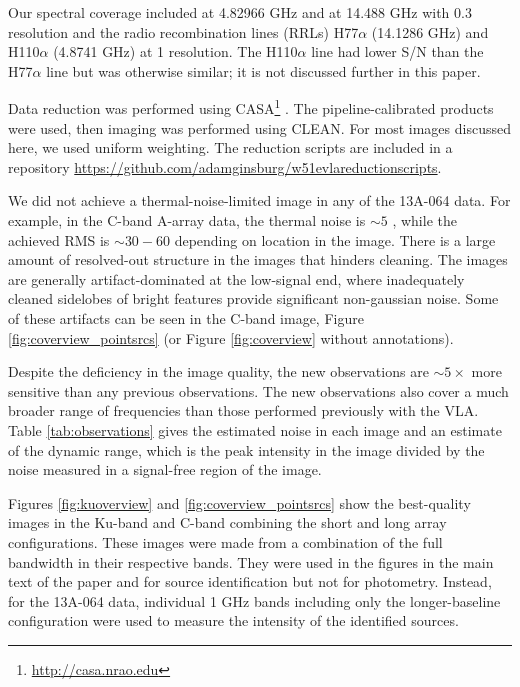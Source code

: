 Our spectral coverage included \ortho
\oneone at 4.82966 GHz and \twotwo at 14.488 GHz with 0.3 \kms resolution and the
radio recombination lines (RRLs) H77$\alpha$ (14.1286 GHz) and H110$\alpha$
(4.8741 GHz) at 1 \kms resolution.  The H110$\alpha$ line had lower S/N than
the H77$\alpha$ line but was otherwise similar; it is not discussed further
in this paper.


Data reduction was performed using CASA\footnote{\url{http://casa.nrao.edu}}
\citep{McMullin2007a}.  The pipeline-calibrated products were
used, then imaging was performed using CLEAN.  For most images discussed here, we
used uniform weighting.  The reduction scripts are included in a repository
\url{https://github.com/adamginsburg/w51evlareductionscripts}.



We did not achieve a thermal-noise-limited image in any of the 13A-064 data.
For example, in the C-band A-array data, the thermal noise is $\sim5$ \microjy,
while the achieved RMS is $\sim30-60$ \microjy depending on location in the
image.  There is a large amount of resolved-out structure in the images that
hinders cleaning.  The images are generally artifact-dominated at the
low-signal end, where inadequately cleaned sidelobes of bright features provide
significant non-gaussian noise.  Some of these artifacts can be seen in the C-band
image, Figure \ref{fig:coverview_pointsrcs} (or Figure \ref{fig:coverview}
without annotations).

Despite the deficiency in the image quality, the new observations are
$\sim5\times$ more sensitive than any previous observations.  The new
observations also cover a much broader range of frequencies than those
performed previously with the VLA.  Table \ref{tab:observations} gives the
estimated noise in each image and an estimate of the dynamic range, which is
the peak intensity in the image divided by the noise measured in a signal-free
region of the image.  

Figures \ref{fig:kuoverview} and \ref{fig:coverview_pointsrcs} show the
best-quality
images in the Ku-band and C-band combining the short and long array
configurations.  These images were made from a combination of the full
bandwidth in their respective bands. They were used in the figures in the main
text of the paper and for source identification but not for photometry.
Instead, for the 13A-064 data, individual 1 GHz bands including only the
longer-baseline configuration were used to measure the intensity of the
identified sources.

